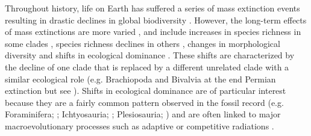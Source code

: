 \documentclass[12pt,letterpaper]{article}
\begin{document}
Throughout history, life on Earth has suffered a series of mass extinction events resulting in drastic declines in global biodiversity \citep[e.g.][]{RaupPT,BentonPT,rennetime2013,Brusatte2015}.
However, the long-term effects of mass extinctions are more varied \citep{Erwin1998344}, and include increases in species richness in some clades \citep{friedmanexplosive2010}, species richness declines in others \citep{Benton85}, changes in morphological diversity \citep{Ciampaglio2001,Ciampaglio2004,kornextinction2013} and shifts in ecological dominance \citep[e.g.][]{Brusatte12092008,toljagictriassic-jurassic2013,bensonfaunal2014}.
These shifts are characterized by the decline of one clade that is replaced by a different unrelated clade with a similar ecological role (e.g. Brachiopoda and Bivalvia at the end Permian extinction \citealt{Sepkiski1981,CLAPHAM01102006} but see \citealt{Payne22052014}). 
Shifts in ecological dominance are of particular interest because they are a fairly common pattern observed in the fossil record (e.g. Foraminifera; \citealt{D'Hondt01011996,Coxall01042006}; Ichtyosauria; \citealt{thorneresetting2011}; Plesiosauria; \citealt{bensonfaunal2014}) and are often linked to major macroevolutionary processes such as adaptive \citep{Losos2010} or competitive radiations \citep{Brusatte12092008}.
\end{document}
